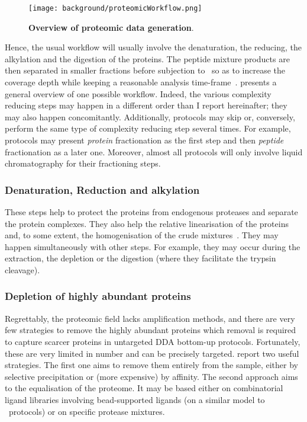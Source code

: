 \begin{figure}[!htb]
    \texttt{[image: background/proteomicWorkflow.png]}\centering
    \caption[Overview of proteomic data generation]{\label{fig:proteomics}%
    \textbf{Overview of proteomic data generation}.}
\end{figure}

Hence, the usual workflow will usually involve the denaturation, the reducing,
the alkylation and the digestion of the proteins. The peptide mixture products
are then separated in smaller fractions before subjection to \ms\ so as to increase
the coverage depth
while keeping a reasonable analysis time-frame~.
 presents a general overview of one possible workflow.
Indeed, the various complexity reducing steps may happen in a different order
than I report hereinafter; they may also happen concomitantly. Additionally,
protocols may skip or,
conversely, perform the same type of complexity reducing step several times.
For example, protocols may present
\emph{protein} fractionation as the first step
and then \emph{peptide} fractionation as a later one.
Moreover, almost all protocols will only involve liquid chromatography for
their fractioning steps.\mybr\


\subsubsection{Denaturation, Reduction and alkylation}

These steps help to protect the proteins
from endogenous proteases and separate the protein complexes.
They also help the relative linearisation of the proteins and, to some extent,
the homogenisation of the crude mixtures~.
They may happen simultaneously with other steps.
For example, they may occur during the extraction, the depletion
or the digestion (where they facilitate the trypsin cleavage).\mybr\

\subsubsection{Depletion of highly abundant proteins}

Regrettably, the proteomic field lacks amplification methods,
and there are very few strategies to remove the highly abundant proteins
which removal is required to
capture scarcer proteins in untargeted \gls{DDA} bottom-up protocols.
Fortunately, these are very limited in number and can be precisely targeted.
\citet{Zhang2014} report two useful strategies. The first one aims to remove
them entirely from the sample, either by selective
precipitation or (more expensive) by affinity.
The second approach aims to the equalisation of the proteome.
It may be based either on combinatorial ligand libraries involving
bead-supported ligands (on a similar model to \Rnaseq\ protocols)
or on specific protease mixtures.\mybr\

